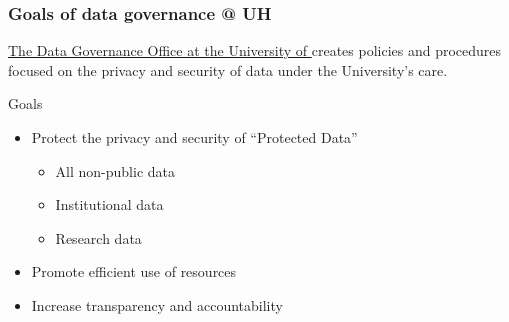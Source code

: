 \begin{frame}
  \frametitle{Goals of data governance @ UH}
  \begin{block}{}
    \href{https://www.hawaii.edu/offices/vp-academic-planning-policy/uh-institutional-data-governance/}{The Data Governance Office at the University of {\hawaii}} creates policies and procedures focused on the privacy and security of data under the University’s care. 
  \end{block}
  \begin{block}{Goals}
  \begin{itemize}
  \item Protect the privacy and security of ``Protected Data''
    \begin{itemize}
    \item All non-public data
    \item Institutional data
    \item Research data
    \end{itemize}
  \item Promote efficient use of resources
  \item Increase transparency and accountability
  \end{itemize}
  \end{block}
\end{frame}


